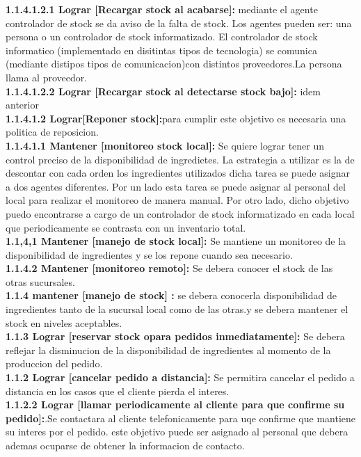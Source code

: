 \documentclass[a4paper,10pt]{article}
\begin{document}
\textbf{1.1.4.1.2.1 Lograr [Recargar stock al acabarse]:} mediante el agente controlador de stock se da aviso de la falta de stock. Los agentes pueden ser: una persona o un controlador de stock informatizado. El controlador de stock informatico (implementado en disitintas tipos de tecnologia) se comunica (mediante distipos tipos de comunicacion)con distintos proveedores.La persona llama al proveedor.\\
\textbf{1.1.4.1.2.2 Lograr [Recargar stock al detectarse stock bajo]:} idem anterior\\
\textbf{1.1.4.1.2 Lograr[Reponer stock]:}para cumplir este objetivo es necesaria una politica de reposicion.\\
\textbf{1.1.4.1.1 Mantener [monitoreo stock local]:} Se quiere lograr tener un control preciso de la disponibilidad de ingredietes. La estrategia a utilizar es la de descontar con cada orden los ingredientes utilizados dicha tarea se puede asignar a dos agentes diferentes. Por un lado esta tarea se puede asignar al personal del local para realizar el monitoreo de manera manual. Por otro lado, dicho objetivo puedo encontrarse a cargo de un controlador de stock informatizado en cada local que periodicamente se contrasta con un inventario total.\\
\textbf{1.1,4,1 Mantener [manejo de stock local]:} Se mantiene un monitoreo de la disponibilidad de ingredientes y se los repone cuando sea necesario.\\
\textbf{1.1.4.2 Mantener [monitoreo remoto]:} Se debera conocer el stock de las otras sucursales. \\
\textbf{1.1.4 mantener [manejo de stock] :} se debera conocerla disponibilidad de ingredientes tanto de la sucursal local como de las otras.y se debera mantener el stock en niveles aceptables.\\
\textbf{1.1.3 Lograr [reservar stock opara pedidos inmediatamente]:} Se debera reflejar la disminucion de la disponibilidad de ingredientes al momento de la produccion del pedido. \\
\textbf{1.1.2 Lograr [cancelar pedido a distancia]:} Se permitira cancelar el pedido a distancia en los casos que el cliente pierda el interes.\\
\textbf{1.1.2.2 Lograr [llamar periodicamente al cliente para que confirme su pedido]:}.Se contactara al cliente telefonicamente para uqe confirme que mantiene su interes por el pedido. este objetivo puede ser asignado al personal que debera ademas ocuparse de obtener la informacion de contacto.\\
\end{document}
